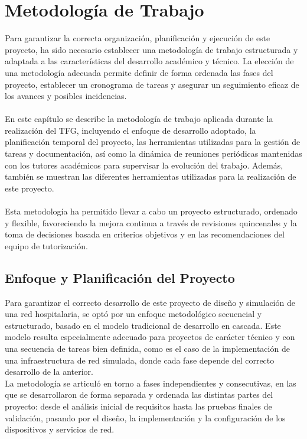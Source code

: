 
\chapter{Metodología de Trabajo}\label{Metodología}
Para garantizar la correcta organización, planificación y ejecución de este proyecto, ha sido necesario establecer una metodología de trabajo estructurada y adaptada 
a las características del desarrollo académico y técnico. La elección de una metodología adecuada permite definir de forma ordenada las fases del proyecto, establecer un 
cronograma de tareas y asegurar un seguimiento eficaz de los avances y posibles incidencias.
\\ \\
En este capítulo se describe la metodología de trabajo aplicada durante la realización del TFG, incluyendo el enfoque de desarrollo adoptado, la planificación temporal del 
proyecto, las herramientas utilizadas para la gestión de tareas y documentación, así como la dinámica de reuniones periódicas mantenidas con los tutores académicos para 
supervisar la evolución del trabajo. Además, también se muestran las diferentes herramientas utilizadas para la realización de este proyecto.
\\ \\
Esta metodología ha permitido llevar a cabo un proyecto estructurado, ordenado y flexible, favoreciendo la mejora continua a través de revisiones quincenales y la toma de 
decisiones basada en criterios objetivos y en las recomendaciones del equipo de tutorización.

\section{Enfoque y Planificación del Proyecto}
Para garantizar el correcto desarrollo de este proyecto de diseño y simulación de una red hospitalaria, se optó por un enfoque metodológico secuencial y estructurado, 
basado en el modelo tradicional de desarrollo en cascada. Este modelo resulta especialmente adecuado para proyectos de carácter técnico y con una secuencia de tareas 
bien definida, como es el caso de la implementación de una infraestructura de red simulada, donde cada fase depende del correcto desarrollo de la anterior.\\

La metodología se articuló en torno a fases independientes y consecutivas, en las que se desarrollaron de forma separada y ordenada las distintas partes del proyecto: 
desde el análisis inicial de requisitos hasta las pruebas finales de validación, pasando por el diseño, la implementación y la configuración de los dispositivos y servicios 
de red.

